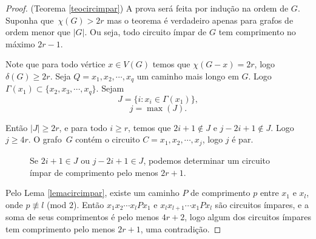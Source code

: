 \begin{proof}(Teorema \ref{teocircimpar})
A prova será feita por indução na ordem de $G$. Suponha que~$\chi(G) > 2r$ mas o teorema é verdadeiro apenas para grafos de ordem menor que $|G|$. Ou seja, todo circuito ímpar de $G$ tem comprimento no máximo $2r-1$.

Note que para todo vértice $x\in V(G)$ temos que $\chi(G - x) = 2r$, logo $\delta(G) \geq 2r$. Seja $Q = x_1,x_2,\cdots,x_q$ um caminho mais longo em $G$. Logo $\Gamma(x_1) \subset \{x_2,x_3,\cdots, x_q\}$. Sejam
\[J = \{i : x_i \in \Gamma(x_1)\},\]
\[j = \max(J).\]

Então $|J| \geq 2r$, e para todo $i\geq r$, temos que $2i+1\not\in J$ e $j-2i+1\not\in J$. Logo $j\geq 4r$. O grafo~$G$ contém o circuito $C=x_1,x_2,\cdots,x_j$, logo $j$ é par.

\begin{figure}[H]
\centering
{}
\caption{Se $2i+1\in J$ ou $j-2i+1\in J$, podemos determinar um circuito ímpar de comprimento pelo menos $2r+1$.}
\label{fig:circimpar-j2r}
\end{figure}

Pelo Lema \ref{lemacircimpar}, existe um caminho $P$ de comprimento $p$ entre $x_1$ e $x_l$, onde $p \not\equiv l$ (mod $2$). Então $x_1 x_2 \cdots x_l P x_1$ e $x_l x_{l+1} \cdots x_1 P x_l$ são circuitos ímpares, e a soma de seus comprimentos é pelo menos $4r+2$, logo algum dos circuitos ímpares tem comprimento pelo menos $2r+1$, uma contradição.
\end{proof}

